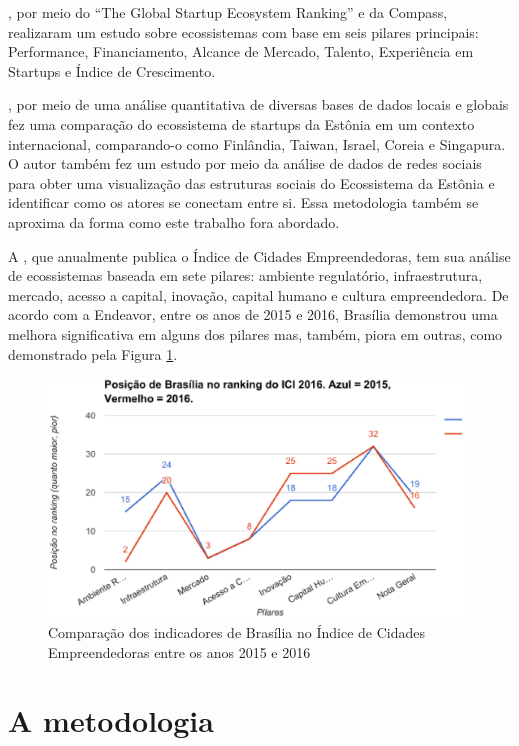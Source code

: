 , por meio do ``The Global Startup Ecosystem Ranking'' e da Compass, realizaram um estudo sobre ecossistemas com base em seis pilares principais: Performance, Financiamento, Alcance de Mercado, Talento, Experiência em Startups e Índice de Crescimento. 

, por meio de uma análise quantitativa de diversas bases de dados locais e globais fez uma comparação do ecossistema de startups da Estônia em um contexto internacional, comparando-o como Finlândia, Taiwan, Israel, Coreia e Singapura. O autor também fez um estudo por meio da análise de dados de redes sociais para obter uma visualização das estruturas sociais do Ecossistema da Estônia e identificar como os atores se conectam entre si. Essa metodologia também se aproxima da forma como este trabalho fora abordado.

A , que anualmente publica o Índice de Cidades Empreendedoras, tem sua análise de ecossistemas baseada em sete pilares: ambiente regulatório, infraestrutura, mercado, acesso a capital, inovação, capital humano e cultura empreendedora. De acordo com a Endeavor, entre os anos de 2015 e 2016, Brasília demonstrou uma melhora significativa em alguns dos pilares mas, também, piora em outras, como demonstrado pela Figura \ref{figure:ici20152016}.

\begin{figure}[!htb]
	\centering
	\includegraphics[width=11cm,angle=0]{figuras/ici20152016}
	\caption{Comparação dos indicadores de Brasília no Índice de Cidades Empreendedoras entre os anos 2015 e 2016}
	\label{figure:ici20152016}
\end{figure}

\section{A metodologia}
\label{section:a_metodologia}

